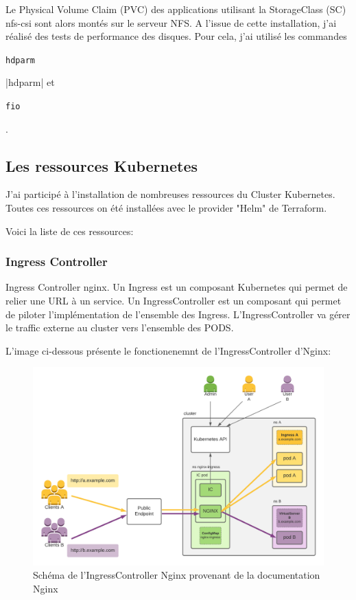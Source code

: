 \documentclass[12pt]{article}
\begin{document}
Le Physical Volume Claim (PVC) des applications utilisant la StorageClass (SC) nfs-csi sont alors montés sur le serveur NFS.
A l'issue de cette installation, j'ai réalisé des tests de performance des disques.
Pour cela, j'ai utilisé les commandes \begin{code}\texttt{hdparm}\end{code}|hdparm| et \begin{code}\texttt{fio}\end{code}.

\subsection{Les ressources Kubernetes}
J'ai participé à l'installation de nombreuses ressources du Cluster \gls{Kubernetes}.
Toutes ces ressources on été installées avec le provider "Helm" de \gls{Terraform}.

Voici la liste de ces ressources:
\subsubsection{Ingress Controller}
Ingress Controller nginx. Un Ingress est un composant \gls{Kubernetes} qui permet de relier une URL à un service.
Un IngressController est un composant qui permet de piloter l'implémentation de l'ensemble des Ingress.
L'IngressController va gérer le traffic externe au \gls{cluster} vers l'ensemble des PODS.

L'image ci-dessous présente le fonctionenemnt de l'IngressController d'Nginx:

\begin{figure}[!ht]
    \centering
        \includegraphics[width=\textwidth]{src/graph_nginx.png}
    \caption{Schéma de l'IngressController Nginx provenant de la documentation Nginx}
    \label{fig:graph_nginx.png}
\end{figure}
\end{document}
